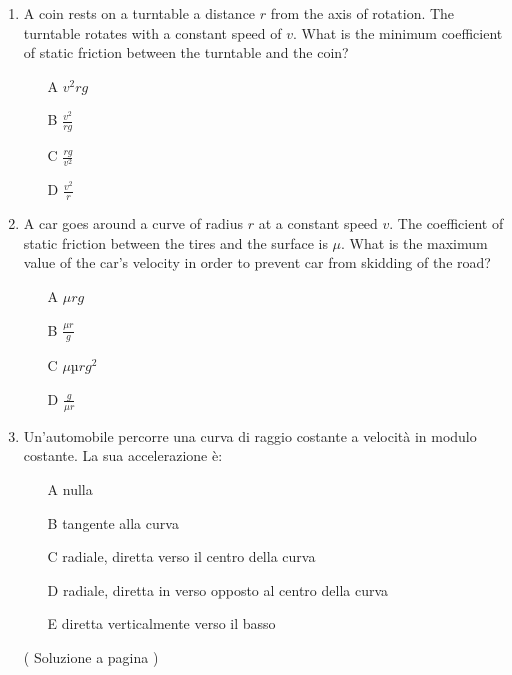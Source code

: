 \begin{enumerate}
\item A coin rests on a turntable a distance $r$ from the axis of rotation.
The turntable rotates with a constant speed of $v$.
What is the minimum coefficient of static friction between the turntable and the coin?

\begin{itemize}
\item[A] $v^2rg$
\item[B] $\frac{v^2}{rg}$
\item[C] $\frac{rg}{v^2}$
\item[D] $\frac{v^2}{r}$
\end{itemize}


\item A car goes around a curve of radius $r$ at a constant speed $v$.
The coefficient of static friction between the tires and the surface is $\mu$.
What is the maximum value of the car’s velocity in order to prevent car from skidding of the road? 
 
\begin{itemize}
\item[A] $\mu rg$
\item[B] $\frac{\mu r}{g}$
\item[C] ${\mu µrg}^2$
\item[D] $\frac{g}{\mu r}$
\end{itemize}

\item 
\label{motocirc_e_00} 

Un’automobile percorre una curva di raggio costante a velocità in modulo costante.
La sua accelerazione è:

\begin{itemize}
\item [A] nulla
\item [B] tangente alla curva
\item [C] radiale, diretta verso il centro della curva
\item [D] radiale, diretta in verso opposto al centro della curva
\item [E] diretta verticalmente verso il basso
\end{itemize}
\label{motocirc_s_00}

( Soluzione a pagina \pageref{motocirc_s_00} )

\end{enumerate}

